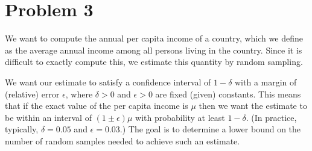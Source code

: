 \documentclass[11pt]{article}
\begin{document}
\section*{Problem 3}

We want to compute the annual per capita income of a country, which we define as the average annual income among
all persons living in the country. Since it is difficult to exactly compute this, we estimate this quantity by random sampling.

We want our estimate to satisfy a confidence interval of $1-\delta$ with a margin of (relative) error $\epsilon$,
where $\delta > 0$ and $\epsilon > 0$ are fixed (given) constants. This means that if the exact value of the per capita
income is $\mu$ then we want the estimate to be within an interval of $(1\pm\epsilon)\mu$  with probability at least $1-\delta$.
 (In practice, typically, $\delta = 0.05$ and $\epsilon = 0.03$.)
The goal is to determine a lower bound on the
number of random samples needed to achieve such an estimate.
\end{document}
